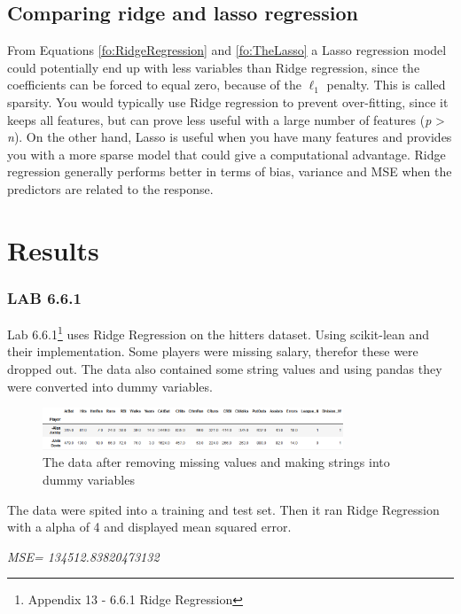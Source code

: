 \subsection{Comparing ridge and lasso regression}

From Equations \ref{fo:RidgeRegression} and \ref{fo:TheLasso} a Lasso regression model could potentially end up with less variables than Ridge regression, since the coefficients can be forced to equal zero, because of the $\ell_1$ penalty. This is called sparsity. You would typically use Ridge regression to prevent over-fitting, since it keeps all features, but can prove less useful with a large number of features (\textit{p} > \textit{n}). On the other hand, Lasso is useful when you have many features and provides you with a more sparse model that could give a computational advantage. Ridge regression generally performs better in terms of bias, variance and MSE when the predictors are related to the response. %

\section{Results}
\subsubsection*{LAB 6.6.1}
Lab 6.6.1\footnote{Appendix 13 - 6.6.1 Ridge Regression} uses Ridge Regression on the hitters dataset. Using scikit-lean and their implementation. Some players were missing salary, therefor these were dropped out. The data also contained some string values and using pandas they were converted  into dummy variables.  
\begin{figure}[H]
	\centering
	\includegraphics[width=0.8\textwidth]{shrinkageMethods/fig/data.png}
	\caption{The data after removing missing values and making strings into dummy variables }
	\label{fig:lab661_data}
\end{figure}
The data were spited into a training and test set. Then it ran Ridge Regression with a alpha of 4 and displayed mean squared error.


\noindent\textit{MSE= 134512.83820473132}

